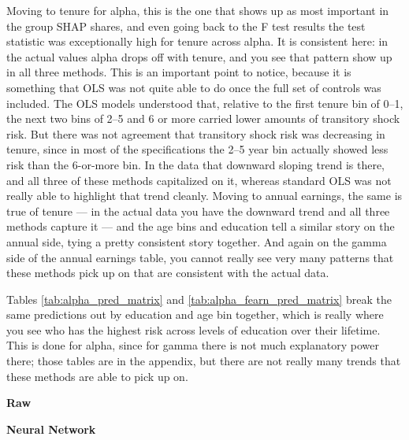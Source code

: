 \documentclass[12pt]{article}
\begin{document}
\begin{onehalfspace}
Moving to tenure for alpha, this is the one that shows up as most important in the group SHAP shares, and even going back to the F test results the test statistic was exceptionally high for tenure across alpha. It is consistent here: in the actual values alpha drops off with tenure, and you see that pattern show up in all three methods. This is an important point to notice, because it is something that OLS was not quite able to do once the full set of controls was included. The OLS models understood that, relative to the first tenure bin of 0--1, the next two bins of 2--5 and 6 or more carried lower amounts of transitory shock risk. But there was not agreement that transitory shock risk was decreasing in tenure, since in most of the specifications the 2--5 year bin actually showed less risk than the 6-or-more bin. In the data that downward sloping trend is there, and all three of these methods capitalized on it, whereas standard OLS was not really able to highlight that trend cleanly. Moving to annual earnings, the same is true of tenure --- in the actual data you have the downward trend and all three methods capture it --- and the age bins and education tell a similar story on the annual side, tying a pretty consistent story together. And again on the gamma side of the annual earnings table, you cannot really see very many patterns that these methods pick up on that are consistent with the actual data.

Tables \ref{tab:alpha_pred_matrix} and \ref{tab:alpha_fearn_pred_matrix} break the same predictions out by education and age bin together, which is really where you see who has the highest risk across levels of education over their lifetime. This is done for alpha, since for gamma there is not much explanatory power there; those tables are in the appendix, but there are not really many trends that these methods are able to pick up on.

\begin{table}[H]
    \centering
    \caption{Mean Predicted Alpha by Education and Age Bin, Hourly Earnings (x 100)}
    \label{tab:alpha_pred_matrix}
    \begin{minipage}[t]{0.48\textwidth}
        \centering
        \textbf{Raw}\\[4pt]
        \resizebox{\linewidth}{!}{%
            
        }
    \end{minipage}\hfill
    \begin{minipage}[t]{0.48\textwidth}
        \centering
        \textbf{Neural Network}\\[4pt]
        \resizebox{\linewidth}{!}{%
            
        }
    \end{minipage}


\end{table}
\end{onehalfspace}
\end{document}
